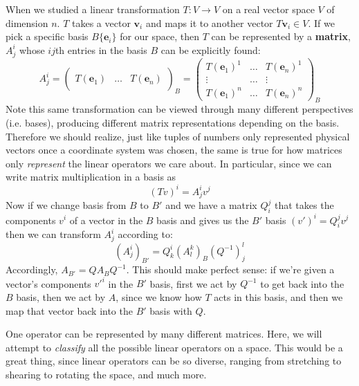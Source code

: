 When we studied a linear transformation $T: V \rightarrow V$ on a real vector space $V$ of dimension $n$. $T$ takes a vector $\mathbf v_i$ and maps it to another vector $T\mathbf v_i \in V$. If we pick a specific basis $B \{ \mathbf e_i \}$ for our space, then $T$ can be represented by a \textbf{matrix}, $A^i_j$ whose $ij$th entries in the basis $B$ can be explicitly found: 
	\begin{equation}
		A^i_j = \begin{pmatrix}
			& & \\
			T(\mathbf e_1) & \dots & T(\mathbf e_n)\\
			& &
		\end{pmatrix}_B
		=\begin{pmatrix}
			T(\mathbf e_1)^1 & \dots & T(\mathbf e_n)^1 \\
			\vdots & \dots & \vdots\\
			T(\mathbf e_1)^n & \dots & T(\mathbf e_n)^n
		\end{pmatrix}_B
	\end{equation}
	Note this same transformation can be viewed through many different perspectives (i.e. bases), producing different matrix representations depending on the basis. Therefore we should realize, just like tuples of numbers only represented physical vectors once a coordinate system was chosen, the same is true for how matrices only \emph{represent} the linear operators we care about. In particular, since we can write matrix multiplication in a basis as
	\begin{equation}
		(Tv)^i = A^i_j v^j
	\end{equation}
	Now if we change basis from $B$ to $B'$ and we have a matrix $Q_i^j$ that takes the components $v^i$ of a vector in the $B$ basis and gives us the $B'$ basis $(v')^i = Q_i^j v^j$ then we can transform $A^i_j$ according to:
	\begin{equation}
		(A^i_j)_{B'} = Q^i_k (A^k_l)_B (Q^{-1})^l_j 
	\end{equation}
	Accordingly, $A_{B'} = Q A_B Q^{-1}$. This should make perfect sense: if we're given a vector's components ${v'}^i$ in the $B'$ basis, first we act by $Q^{-1}$ to get back into the $B$ basis, then we act by $A$, since we know how $T$ acts in this basis, and then we map that vector back into the $B'$ basis with $Q$.
	
	One operator can be represented by many different matrices. Here, we will attempt to \emph{classify} all the possible linear operators on a space. This would be a great thing, since linear operators can be so diverse, ranging from stretching to shearing to rotating the space, and much more. 
	
